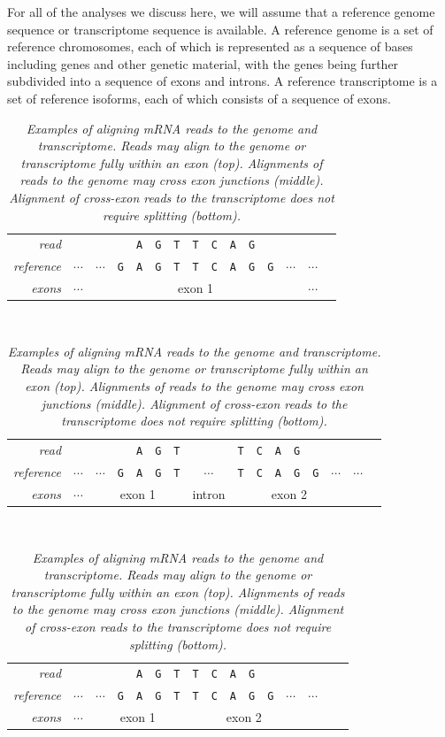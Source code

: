 \documentclass[11pt]{report}
\newcommand{\mybase}[1]{\texttt{#1}\xspace}
\newcommand{\baseA}{\mybase{A}}
\newcommand{\baseC}{\mybase{C}}
\newcommand{\baseG}{\mybase{G}}
\newcommand{\baseT}{\mybase{T}}
\newcommand{\mycaption}[2]{\caption{\small\it #2}\label{#1}}
\begin{document}
For all of the analyses we discuss here, we will assume that a
reference genome sequence or transcriptome sequence is available. A
reference genome is a set of reference chromosomes, each of which is
represented as a sequence of bases including genes and other genetic
material, with the genes being further subdivided into a sequence of
exons and introns. A reference transcriptome is a set of reference
isoforms, each of which consists of a sequence of exons.

\begin{table}[t!]
  \centering\small
  \begin{tabular}{r|cccccccccccccc}
    \textit{read} &  & & & \baseA & \baseG & \baseT & \baseT & \baseC & \baseA & \baseG &
    \\
    \textit{reference} & $\cdots$ & $\cdots$ & \baseG & \baseA & \baseG & \baseT & \baseT & \baseC & \baseA & \baseG & \baseG & $\cdots$ & $\cdots$
    \\ \hline
    \textit{exons} & $\cdots$ & \multicolumn{11}{|c|}{exon 1} & $\cdots$
  \end{tabular}
  \\[12pt]
  \begin{tabular}{r|ccccccccccccccc}
    \textit{read} &  & & & \baseA & \baseG & \baseT & & \baseT & \baseC & \baseA & \baseG &
    \\
    \textit{reference} & $\cdots$ & $\cdots$ & \baseG & \baseA & \baseG & \baseT & $\cdots$ & \baseT & \baseC & \baseA & \baseG & \baseG & $\cdots$ & $\cdots$
    \\ \hline
    \textit{exons} & $\cdots$ & \multicolumn{5}{|c|}{exon 1} & intron
                         & \multicolumn{6}{|c|}{exon 2}
  \end{tabular}
  \\[12pt]
  \begin{tabular}{r|ccccccccccccccc}
    \textit{read} &  & & & \baseA & \baseG & \baseT & \baseT & \baseC & \baseA & \baseG &
    \\
    \textit{reference} & $\cdots$ & $\cdots$ & \baseG & \baseA & \baseG & \baseT & \baseT & \baseC & \baseA & \baseG & \baseG  & $\cdots$ & $\cdots$
    \\ \hline
    \textit{exons} & $\cdots$ & \multicolumn{5}{|c|}{exon 1}
                       & \multicolumn{6}{|c|}{exon 2}
  \end{tabular}
  \mycaption{tab:split-align}{Examples of aligning mRNA reads to the
    genome and transcriptome. Reads may align to the genome or
    transcriptome fully within an exon (top). Alignments of reads to
    the genome may cross exon junctions (middle). Alignment of
    cross-exon reads to the transcriptome does not require splitting
    (bottom).}
  \label{tab:my_label}
\end{table}
\end{document}
